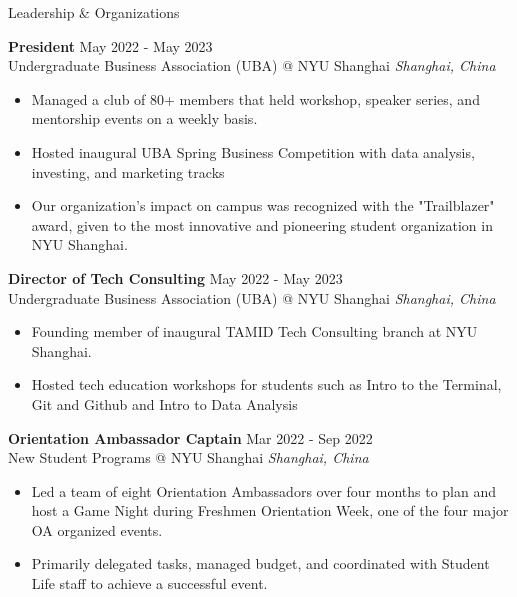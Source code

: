 \documentclass{cv} %
\begin{document}
\begin{rSection}{Leadership \& Organizations}

	\textbf{President} \hfill May 2022 - May 2023 \\
	Undergraduate Business Association (UBA) @ NYU Shanghai \hfill \textit{Shanghai, China}
	\begin{itemize}
		\item Managed a club of 80+ members that held workshop, speaker series, and mentorship events on a weekly basis.
		\item Hosted inaugural UBA Spring Business Competition with data analysis, investing, and marketing tracks
		\item Our organization's impact on campus was recognized with the "Trailblazer" award, given to the most innovative and pioneering student organization in NYU Shanghai.
	\end{itemize}

	\textbf{Director of Tech Consulting} \hfill May 2022 - May 2023 \\
	Undergraduate Business Association (UBA) @ NYU Shanghai \hfill \textit{Shanghai, China}
	\begin{itemize}
		\item Founding member of inaugural TAMID Tech Consulting branch at NYU Shanghai.
		\item Hosted tech education workshops for students such as Intro to the Terminal, Git and Github and Intro to Data Analysis
	\end{itemize}

	\textbf{Orientation Ambassador Captain} \hfill Mar 2022 - Sep 2022 \\
	New Student Programs @ NYU Shanghai \hfill \textit{Shanghai, China}
	\begin{itemize}
		\item Led a team of eight Orientation Ambassadors over four months to plan and host a Game Night during Freshmen Orientation Week, one of the four major OA organized events.
		\item Primarily delegated tasks, managed budget, and coordinated with Student Life staff to achieve a successful event.
	\end{itemize}


\end{rSection}
\end{document}
